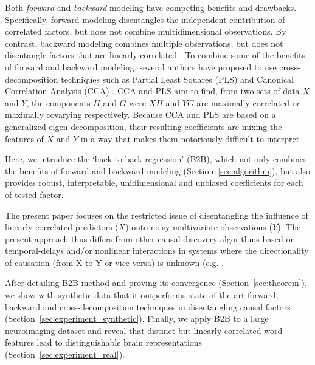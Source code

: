 Both \emph{forward} and \emph{backward} modeling have competing benefits and drawbacks.
Specifically, forward modeling disentangles the independent contribution of
correlated factors, but does not combine multidimensional observations. By
contrast, backward modeling combines multiple observations, but does not
disentangle factors that are linearly correlated \citep{weichwald2015causal,
hebart2018deconstructing, king2018encoding}. To combine some of the benefits of forward
and backward modeling, several authors have proposed to use cross-decomposition
techniques such as Partial Least Squares (PLS) and Canonical Correlation
Analysis (CCA) \citep{de2019multiway}. CCA and PLS aim to find, from two sets of
data $X$ and $Y$, the components $H$ and $G$ were $XH$ and $YG$ are maximally
correlated or maximally covarying respectively. Because CCA and PLS are based on
a generalized eigen decomposition, their resulting coefficients are mixing the
features of $X$ and $Y$ in a way that makes them notoriously difficult to
interpret \citep{lebart1995statistique}.

Here, we introduce the `back-to-back regression' (B2B), which not only combines
the benefits of forward and backward modeling (Section~\ref{sec:algorithm}), but
also provides robust, interpretable, unidimensional and unbiased coefficients for
each of tested factor.

The present paper focuses on the restricted issue of disentangling the
influence of linearly correlated predictors ($X$) onto noisy multivariate
observations ($Y$). The present approach thus differs from other causal
discovery algorithms based on temporal-delays and/or nonlinear interactions in
systems where the directionality of causation (from X to Y or vice versa) is
unknown (e.g. \citep{peters2017elements, granger1969investigating,
janzing2013quantifying, scholkopf2016modeling}.

After detailing B2B method and proving its convergence
(Section~\ref{sec:theorem}), we show with synthetic data that it outperforms
state-of-the-art forward, backward and cross-decomposition techniques in
disentangling causal factors (Section~\ref{sec:experiment_synthetic}). Finally,
we apply B2B to a large neuroimaging dataset and reveal that distinct but
linearly-correlated word features lead to distinguishable brain representations
(Section~\ref{sec:experiment_real}).
